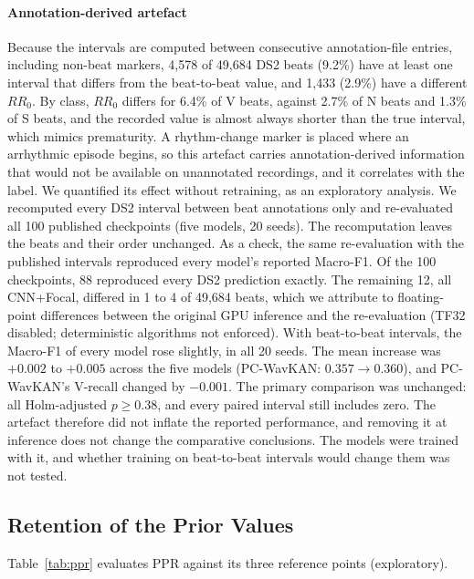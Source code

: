 \documentclass[preprint,12pt]{elsarticle}
\begin{document}
\paragraph{Annotation-derived artefact} Because the intervals are computed between consecutive annotation-file entries, including non-beat markers, 4,578 of 49,684 DS2 beats (9.2\%) have at least one interval that differs from the beat-to-beat value, and 1,433 (2.9\%) have a different $RR_0$. By class, $RR_0$ differs for 6.4\% of V beats, against 2.7\% of N beats and 1.3\% of S beats, and the recorded value is almost always shorter than the true interval, which mimics prematurity. A rhythm-change marker is placed where an arrhythmic episode begins, so this artefact carries annotation-derived information that would not be available on unannotated recordings, and it correlates with the label. We quantified its effect without retraining, as an exploratory analysis. We recomputed every DS2 interval between beat annotations only and re-evaluated all 100 published checkpoints (five models, 20 seeds). The recomputation leaves the beats and their order unchanged. As a check, the same re-evaluation with the published intervals reproduced every model's reported Macro-F1. Of the 100 checkpoints, 88 reproduced every DS2 prediction exactly. The remaining 12, all CNN+Focal, differed in 1 to 4 of 49,684 beats, which we attribute to floating-point differences between the original GPU inference and the re-evaluation (TF32 disabled; deterministic algorithms not enforced). With beat-to-beat intervals, the Macro-F1 of every model rose slightly, in all 20 seeds. The mean increase was $+0.002$ to $+0.005$ across the five models (PC-WavKAN: $0.357\rightarrow0.360$), and PC-WavKAN's V-recall changed by $-0.001$. The primary comparison was unchanged: all Holm-adjusted $p \geq 0.38$, and every paired interval still includes zero. The artefact therefore did not inflate the reported performance, and removing it at inference does not change the comparative conclusions. The models were trained with it, and whether training on beat-to-beat intervals would change them was not tested.

\subsection{Retention of the Prior Values}
\label{sec:results_ppr}
Table~\ref{tab:ppr} evaluates PPR against its three reference points (exploratory).
\end{document}
